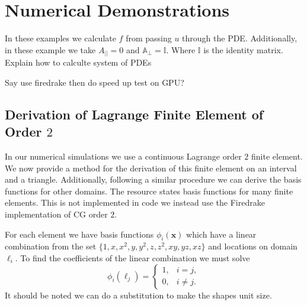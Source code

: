 \documentclass[12pt]{ociamthesis}
\begin{document}
\chapter{Numerical Demonstrations}
In these examples we calculate $f$ from passing $u$ through the PDE. Additionally, in these example we take $A_{||}=0$ and $\mathbb{A}_{\perp} = \mathbb{I}$. Where $\mathbb{I}$ is the identity matrix.
Explain how to calculte system of PDEs

Say use firedrake then do speed up test on GPU?

\section{Derivation of Lagrange Finite Element of Order $2$}
In our numerical simulations we use a continuous Lagrange order $2$ finite element. We now provide a method for the derivation of this finite element on an interval and a triangle. Additionally, following a similar procedure we can derive the basis functions for other domains. The resource \cite{defelement} states basis functions for many finite elements. This is not implemented in code we instead use the Firedrake implementation of CG order $2$. 

For each element we have basis functions $\phi_i(\mathbf{x})$ which have a linear combination from the set $\{1, x, x^2, y, y^2, z, z^2, xy, yz, xz\}$ and locations on domain $\ell_i$.  To find the coefficients of the linear combination we must solve
\begin{equation} \label{CG_eq}
\phi_i(\ell_j) =
\begin{cases}
1, &i=j,\\
0, &i\neq j.
\end{cases}
\end{equation}
It should be noted we can do a substitution to make the shapes unit size.
\end{document}
